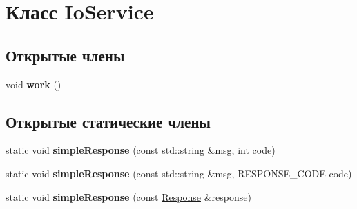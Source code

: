 \hypertarget{class_io_service}{}\section{Класс Io\+Service}
\label{class_io_service}
\subsection*{Открытые члены}
\begin{DoxyCompactItemize}
\item 
\mbox{\label{class_io_service_a567121c3f219b94b076d622d6881c0ef}} 
void {\bfseries work} ()
\end{DoxyCompactItemize}
\subsection*{Открытые статические члены}
\begin{DoxyCompactItemize}
\item 
\mbox{\label{class_io_service_a707f96e25e98c5caaace1100095e374a}} 
static void {\bfseries simple\+Response} (const std\+::string \&msg, int code)
\item 
\mbox{\label{class_io_service_a73cdc0bb026f8dae7be3649b269ad541}} 
static void {\bfseries simple\+Response} (const std\+::string \&msg, R\+E\+S\+P\+O\+N\+S\+E\+\_\+\+C\+O\+DE code)
\item 
\mbox{\label{class_io_service_a3c3ec538c9632b5aff0d4770a1c5822e}} 
static void {\bfseries simple\+Response} (const \hyperlink{class_response}{Response} \&response)
\end{DoxyCompactItemize}
